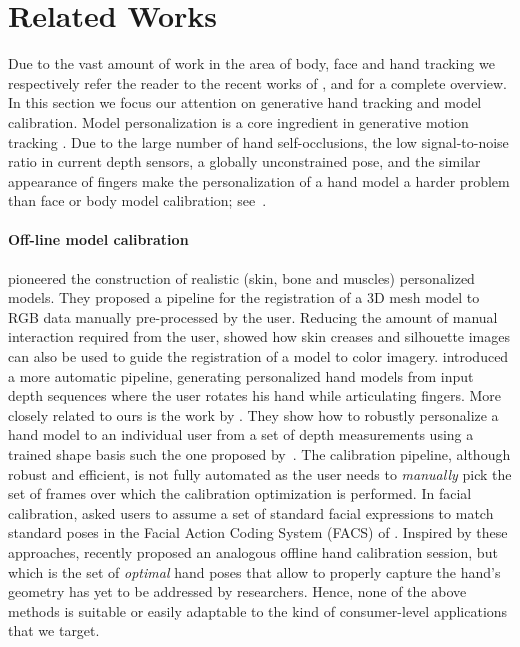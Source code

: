 \section{Related Works}
Due to the vast amount of work in the area of body, face and hand tracking we respectively refer the reader to the recent works of ,  and  for a complete overview. In this section we focus our attention on generative hand tracking and model calibration. Model personalization is a core ingredient in generative motion tracking \cite{pons2011model}.  Due to the large number of hand self-occlusions, the low signal-to-noise ratio in current depth sensors, a globally unconstrained pose, and the similar appearance of fingers make the personalization of a hand model a harder problem than face or body model calibration; see~\cite{supancic2015depth}.

\paragraph{Off-line model calibration}
 pioneered the construction of realistic (skin, bone and muscles) personalized models. They proposed a pipeline for the registration of a 3D mesh model to RGB data manually pre-processed by the user. Reducing the amount of manual interaction required from the user,  showed how skin creases and silhouette images can also be used to guide the registration of a model to color imagery.  introduced a more automatic pipeline, generating personalized hand models from input depth sequences where the user rotates his hand while articulating fingers. More closely related to ours is the work by . They show how to robustly personalize a hand model to an individual user from a set of depth measurements using a trained shape basis such the one proposed by~. The calibration pipeline, although robust and efficient, is not fully automated as the user needs to \emph{manually} pick the set of frames over which the calibration optimization is performed. 
In facial calibration,  asked users to assume a set of standard facial expressions to match standard poses in the Facial Action Coding System (FACS) of .
Inspired by these approaches,  recently proposed an analogous offline hand calibration session, but which is the set of \emph{optimal} hand poses that allow to properly capture the hand's geometry has yet to be addressed by researchers. Hence, none of the above methods is suitable or easily adaptable to the kind of consumer-level applications that we target.

